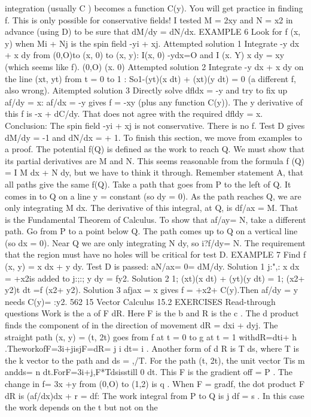 integration (usually C ) becomes a function C(y).
You will get practice in finding f. This is only possible for conservative fields! I
tested M = 2xy and N = x2 in advance (using D) to be sure that dM/dy = dN/dx.
EXAMPLE 6 Look for f (x, y) when Mi + Nj is the spin field -yi + xj.
Attempted solution 1 Integrate -y dx + x dy from (0,O)to (x, 0) to (x, y):
I(x, 0)
-ydx=O and I
(x. Y)
x dy = xy (which seems like f).
(0,O) (x. 0)
Attempted solution 2 Integrate -y dx + x dy on the line (xt, yt) from t = 0 to 1 :
So1-(yt)(x dt) + (xt)(y dt) = 0 (a different f, also wrong).
Aitempted solution 3 Directly solve dfldx = -y and try to fix up af/dy = x:
af/dx = -y gives f = -xy (plus any function C(y)).
The y derivative of this f is -x + dC/dy. That does not agree with the required
dfldy = x. Conclusion: The spin field -yi + xj is not conservative. There is no f.
Test D gives dM/dy = -1 and dN/dx = + 1.
To finish this section, we move from examples to a proof. The potential f(Q) is
defined as the work to reach Q. We must show that its partial derivatives are M and
N. This seems reasonable from the formula f (Q) = I M dx + N dy, but we have to
think it through.
Remember statement A, that all paths give the same f(Q). Take a path that goes
from P to the left of Q. It comes in to Q on a line y = constant (so dy = 0). As the
path reaches Q, we are only integrating M dx. The derivative of this integral, at Q, is
df/ax = M. That is the Fundamental Theorem of Calculus.
To show that af/ay= N, take a different path. Go from P to a point below Q. The
path comes up to Q on a vertical line (so dx = 0). Near Q we are only integrating
N dy, so i?f/dy= N.
The requirement that the region must have no holes will be critical for test D.
EXAMPLE 7 Find f (x, y) = x dx + y dy. Test D is passed: aN/ax= 0= dM/dy.
Solution 1 j:",: x dx = +x2is added to j:;:; y dy = fy2.
Solution 2 1; (xt)(x dt) + (yt)(y dt) = 1; (x2+ y2)t dt =f (x2+ y2).
Solution 3 afjax = x gives f = +x2+ C(y).Then af/dy = y needs C(y)= :y2. 
562 15 Vector Calculus
15.2 EXERCISES
Read-through questions
Work is the a of F dR. Here F is the b and R is
the c . The d product finds the component of
in the direction of movement dR = dxi + dyj. The straight
path (x, y) = (t, 2t) goes from f at t = 0 to g at t =
1 withdR=dti+ h .TheworkofF=3i+jisjF=dR=
j i dt= i .
Another form of d R is T ds, where T is the k vector to
the path and ds = ,/T. For the path (t, 2t), the unit vector
Tis m andds= n dt.ForF=3i+j,F*Tdsisstill
0 dt. This F is the gradient off = P . The change in
f= 3x +y from (0,O) to (1,2) is q .
When F = gradf, the dot product F dR is (af/dx)dx + r = df: The work integral from P to Q is j df = s . In this case the work depends on the t but not on the
